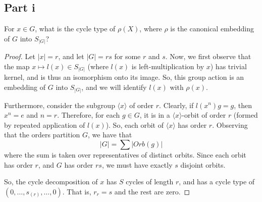 \documentclass[12pt,reqno]{amsart}
\begin{document}
\subsection*{Part i}
For $x\in G$, what is the cycle type of $\rho(X)$, where $\rho$ is the canonical
embedding of $G$ into $S_{|G|}$?
\\
\begin{proof}
    Let $|x| = r$, and let $|G| = rs$ for some $r$ and $s$. Now, we first
    observe that the map $x\mapsto l(x)\in S_{|G|}$ (where $l(x)$ is left-multiplication by
    $x$) has trivial kernel, and is thus an isomorphism onto its image.
    So, this group action is an embedding of $G$ into $S_{|G|}$, and we will
    identify $l(x)$ with $\rho(x)$.

    Furthermore, consider the subgroup $\langle x\rangle$ of order $r$.
    Clearly, if $l(x^n)g=g$, then $x^n = e$ and $n=r$. Therefore, for each
    $g\in G$, it is in a $\langle x\rangle$-orbit of order $r$ (formed by
    repeated application of $l(x)$). So, each orbit of $\langle x\rangle$ has
    order $r$. Observing that the orders partition $G$, we have that
    \[
        |G| = \sum|Orb(g)|
    \]
    where the sum is taken over representatives of distinct orbits. Since 
    each orbit has order $r$, and $G$ has order $rs$, we must have exactly $s$
    disjoint orbits.

    So, the cycle decomposition of $x$ has $S$ cycles of length $r$,
    and has a cycle type of $(0,\ldots,s_{(r)},\ldots,0)$. That is,
    $r_r = s$ and the rest are zero.
\end{proof}
\end{document}
